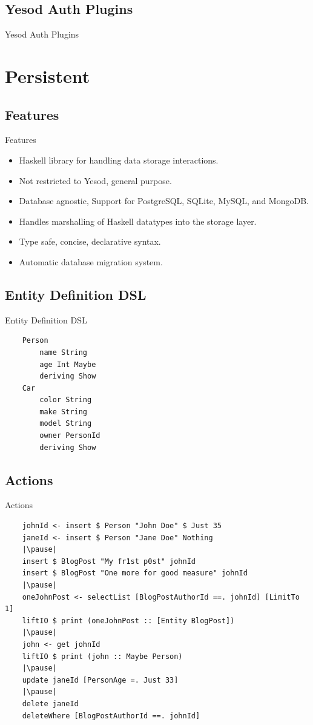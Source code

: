 \documentclass[pdf]{beamer}
\begin{document}
\subsection{Yesod Auth Plugins}
\begin{frame}{Yesod Auth Plugins}

\end{frame}

\section{Persistent}
\subsection{Features}
\begin{frame}{Features}
  \begin{itemize}
  \item<1-> Haskell library for handling data storage interactions.
  \item<2-> Not restricted to Yesod, general purpose.
  \item<3-> Database agnostic, Support for PostgreSQL, SQLite, MySQL, and MongoDB.
  \item<4-> Handles marshalling of Haskell datatypes into the storage layer.
  \item<5-> Type safe, concise, declarative syntax.
  \item<6-> Automatic database migration system.
  \end{itemize}
\end{frame}

\subsection{Entity Definition DSL}
\begin{frame}[fragile]{Entity Definition DSL}
  \begin{verbatim}
    Person
        name String
        age Int Maybe
        deriving Show
    Car
        color String
        make String
        model String
        owner PersonId
        deriving Show
  \end{verbatim}
\end{frame}

\subsection{Actions}
\begin{frame}[fragile]{Actions}
  \begin{verbatim}
    johnId <- insert $ Person "John Doe" $ Just 35
    janeId <- insert $ Person "Jane Doe" Nothing
    |\pause|
    insert $ BlogPost "My fr1st p0st" johnId
    insert $ BlogPost "One more for good measure" johnId
    |\pause|
    oneJohnPost <- selectList [BlogPostAuthorId ==. johnId] [LimitTo 1]
    liftIO $ print (oneJohnPost :: [Entity BlogPost])
    |\pause|
    john <- get johnId
    liftIO $ print (john :: Maybe Person)
    |\pause|
    update janeId [PersonAge =. Just 33]
    |\pause|
    delete janeId
    deleteWhere [BlogPostAuthorId ==. johnId]
  \end{verbatim}
\end{frame}
\end{document}
